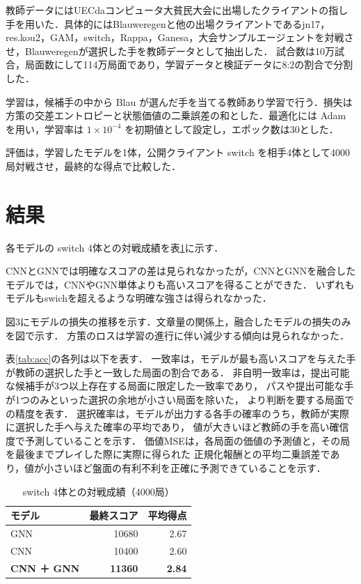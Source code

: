 \documentclass[a4j,dvipdfmx]{jarticle}
\begin{document}
\begin{Abstract}
教師データにはUECdaコンピュータ大貧民大会に出場したクライアントの指し手を用いた．具体的にはBlauweregenと他の出場クライアントであるjn17，res.kou2，GAM，switch，Rappa，Ganesa，大会サンプルエージェントを対戦させ，Blauweregenが選択した手を教師データとして抽出した．
試合数は10万試合，局面数にして114万局面であり，学習データと検証データに8:2の割合で分割した．

学習は，候補手の中から Blau が選んだ手を当てる教師あり学習で行う．損失は方策の交差エントロピーと状態価値の二乗誤差の和とした．最適化には Adam を用い，学習率は $1\times10^{-4}$ を初期値として設定し，エポック数は30とした．

評価は，学習したモデルを1体，公開クライアント switch を相手4体として4000局対戦させ，最終的な得点で比較した．


\section{結果}

各モデルの switch 4体との対戦成績を表\ref{tab:result}に示す．

CNNとGNNでは明確なスコアの差は見られなかったが，CNNとGNNを融合したモデルでは，CNNやGNN単体よりも高いスコアを得ることができた．
いずれもモデルもswichを超えるような明確な強さは得られなかった．

図3にモデルの損失の推移を示す．文章量の関係上，融合したモデルの損失のみを図で示す．
方策のロスは学習の進行に伴い減少する傾向は見られなかった．


表\ref{tab:acc}の各列は以下を表す．
一致率は，モデルが最も高いスコアを与えた手が教師の選択した手と一致した局面の割合である．
非自明一致率は，提出可能な候補手が3つ以上存在する局面に限定した一致率であり，
パスや提出可能な手が1つのみといった選択の余地が小さい局面を除いた，
より判断を要する局面での精度を表す．
選択確率は，モデルが出力する各手の確率のうち，教師が実際に選択した手へ与えた確率の平均であり，
値が大きいほど教師の手を高い確信度で予測していることを示す．
価値MSEは，各局面の価値の予測値と，その局を最後までプレイした際に実際に得られた
正規化報酬との平均二乗誤差であり，値が小さいほど盤面の有利不利を正確に予測できていることを示す．



\begin{table}[H]
  \centering
  \caption{switch 4体との対戦成績（4000局）}
  \label{tab:result}
  \small
  \begin{tabular}{lrr}
    \toprule
    モデル & 最終スコア & 平均得点 \\
    \midrule
    GNN & 10680 & 2.67 \\
    CNN & 10400 & 2.60 \\
    \textbf{CNN ＋ GNN} & \textbf{11360} & \textbf{2.84} \\
    \bottomrule
  \end{tabular}
\end{table}


\end{Abstract}
\end{document}
